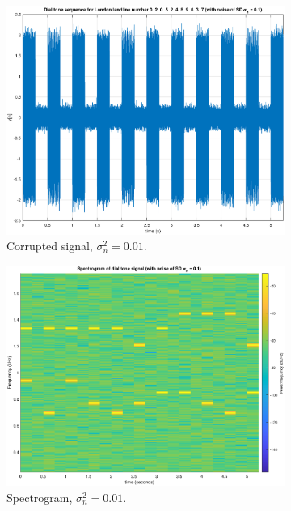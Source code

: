 \begin{figure}[H]
\begin{subfigure}{.32\textwidth}
  \centering
  \includegraphics[width=\linewidth]{assignment3figs/sig_sd01.eps}  
  \caption{Corrupted signal, $\sigma_{n}^{2} = 0.01$.}
\end{subfigure}
\begin{subfigure}{.32\textwidth}
  \centering
  \includegraphics[width=\linewidth]{assignment3figs/spec_sd01.eps}  
  \caption{Spectrogram, $\sigma_{n}^{2} = 0.01$.}
\end{subfigure}
\begin{subfigure}{.32\textwidth}

\end{subfigure}
\end{figure}
